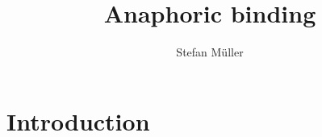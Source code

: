 \documentclass[output=paper,biblatex,babelshorthands,newtxmath,draftmode,colorlinks,citecolor=brown]{langscibook}
\title{Anaphoric binding}
\author{Stefan Müller\affiliation{Humboldt-Universität zu Berlin}}
\begin{document}
\maketitle
\label{chap-binding}

\section{Introduction} 
\label{binding:sec-introduction}




\end{document}
